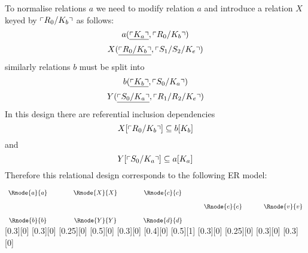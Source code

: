 To normalise relations $a$ we need to modify relation $a$ and introduce a relation $X$ keyed by $\left\ulcorner R_0/K_b\right\urcorner$ as follows:
\begin{equation}
\label{normalrelationa}
a(\underline{\left\ulcorner K_a\right\urcorner},\left\ulcorner R_0/K_b\right\urcorner)
\end{equation}
\begin{equation}
\label{relationX}
X(\underline{\left\ulcorner R_0/K_b\right\urcorner},\left\ulcorner S_1/S_2/K_e\right\urcorner)
\end{equation}
similarly relations $b$ must be split into
\begin{equation}
\label{normalrelationb}
b(\underline{\left\ulcorner K_b\right\urcorner},\left\ulcorner S_0/K_a\right\urcorner)
\end{equation}
\begin{equation}
\label{relationY}
Y(\underline{\left\ulcorner S_0/K_a\right\urcorner},\left\ulcorner R_1/R_2/K_e\right\urcorner)
\end{equation}
In this design there are referential inclusion dependencies 
\begin{equation}
X[\left\ulcorner R_0/K_b\right\urcorner] \subseteq b[K_b]
\end{equation}
and
\begin{equation}
Y[\left\ulcorner S_0/K_a\right\urcorner] \subseteq a[K_a]
\end{equation}
Therefore this relational design corresponds to the following ER model:
\vspace{1.5cm}
\begin{center}
$
\begin{array}{c p{0.75cm} c p{0.75cm}c p{0.5cm}c p{0.5cm}c}
 \Rnode{a}{a}  && \Rnode{X}{X}  && \Rnode{c}{c}  &&              &&              \\ [0.35cm]
	 	           &&               &&               && \Rnode{e}{e} && \Rnode{v}{v} \\ [0.35cm]     
 \Rnode{b}{b}  && \Rnode{Y}{Y}  && \Rnode{d}{d}  &&              &&              \\ 
\end{array}
$
[0.3][0]
\idcomp
{}
[0.3][0]
[0.25][0]
\idcomp
{} 
[0.5][0]
[0.3][0]
\idcomp
{}
[0.4][0]
\idcomp
{}
[0.5][1]
[0.3][0]
\idcomp
{}
[0.25][0]
\idcomp
{}
[0.3][0]
[0.3][0]
\idcomp
\end{center}
\vspace{1.5cm}